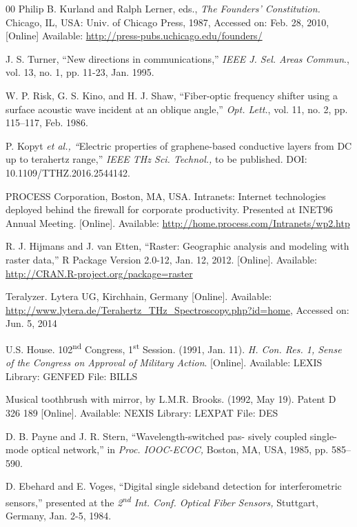 \documentclass[twoside,web]{ieeecolor}
\begin{document}
\begin{thebibliography}{00}
 Philip B. Kurland and Ralph Lerner, eds., \emph{The
Founders' Constitution.} Chicago, IL, USA: Univ. of Chicago Press,
1987, Accessed on: Feb. 28, 2010, [Online] Available:
\underline{http://press-pubs.uchicago.edu/founders/}

 J. S. Turner, ``New directions in communications,'' \emph{IEEE J. Sel. Areas Commun}., vol. 13, no. 1, pp. 11-23, Jan. 1995.

 W. P. Risk, G. S. Kino, and H. J. Shaw, ``Fiber-optic frequency shifter using a surface acoustic wave incident at an oblique angle,'' \emph{Opt. Lett.}, vol. 11, no. 2, pp. 115--117, Feb. 1986.

 P. Kopyt \emph{et al., ``}Electric properties of graphene-based conductive layers from DC up to terahertz range,'' \emph{IEEE THz Sci. Technol.,} to be published. DOI: 10.1109/TTHZ.2016.2544142.

 PROCESS Corporation, Boston, MA, USA. Intranets:
Internet technologies deployed behind the firewall for corporate
productivity. Presented at INET96 Annual Meeting. [Online].
Available: \underline{http://home.process.com/Intranets/wp2.htp}

 R. J. Hijmans and J. van Etten, ``Raster: Geographic analysis and modeling with raster data,'' R Package Version 2.0-12, Jan. 12, 2012. [Online]. Available: \underline {http://CRAN.R-project.org/package=raster} 

 Teralyzer. Lytera UG, Kirchhain, Germany [Online].
Available:
\underline{http://www.lytera.de/Terahertz\_THz\_Spectroscopy.php?id=home}, Accessed on: Jun. 5, 2014

 U.S. House. 102\textsuperscript{nd} Congress, 1\textsuperscript{st} Session. (1991, Jan. 11). \emph{H. Con. Res. 1, Sense of the Congress on Approval of}  \emph{Military Action}. [Online]. Available: LEXIS Library: GENFED File: BILLS

 Musical toothbrush with mirror, by L.M.R. Brooks. (1992, May 19). Patent D 326 189 [Online]. Available: NEXIS Library: LEXPAT File: DES

 D. B. Payne and J. R. Stern, ``Wavelength-switched pas- sively coupled single-mode optical network,'' in \emph{Proc. IOOC-ECOC,} Boston, MA, USA, 1985, pp. 585--590.

 D. Ebehard and E. Voges, ``Digital single sideband detection for interferometric sensors,'' presented at the \emph{2\textsuperscript{nd} Int. Conf. Optical Fiber Sensors,} Stuttgart, Germany, Jan. 2-5, 1984.


\end{thebibliography}
\end{document}
